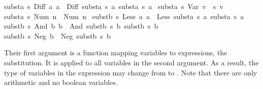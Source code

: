\begin{isabellebody}
{}substa\ s\ {}Diff\ a{}\ a{}{}\ {}\ Diff\ {}substa\ s\ a{}{}\ {}substa\ s\ a{}{}{}\ {}\isanewline
{}substa\ s\ {}Var\ v{}\ {}\ s\ v{}\ {}\isanewline
{}substa\ s\ {}Num\ n{}\ {}\ Num\ n{}\ {}\isanewline
\isanewline
{}substb\ s\ {}Less\ a{}\ a{}{}\ {}\ Less\ {}substa\ s\ a{}{}\ {}substa\ s\ a{}{}{}\ {}\isanewline
{}substb\ s\ {}And\ b{}\ b{}{}\ {}\ And\ {}substb\ s\ b{}{}\ {}substb\ s\ b{}{}{}\ {}\isanewline
{}substb\ s\ {}Neg\ b{}\ {}\ Neg\ {}substb\ s\ b{}{}%
\begin{isamarkuptext}%
\noindent
Their first argument is a function mapping variables to expressions, the
substitution. It is applied to all variables in the second argument. As a
result, the type of variables in the expression may change from 
to . Note that there are only arithmetic and no boolean variables.


\end{isamarkuptext}
\end{isabellebody}
